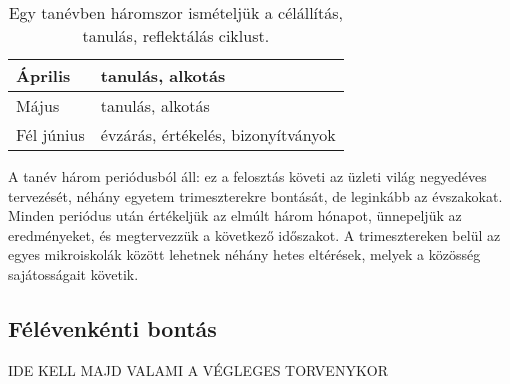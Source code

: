 \begin{table}
\begin{tabular}{ l|l }
    Április          &
    tanulás, alkotás
    \\ \hline

    Május            &
    tanulás, alkotás
    \\ \hline

    Fél június       &
    évzárás, értékelés, bizonyítványok
  \end{tabular}
  \caption{Egy tanévben háromszor ismételjük a célállítás, tanulás,
    reflektálás ciklust.}
  \label{tbl:tanevritmus}
\end{table}

A tanév három periódusból áll: ez a felosztás követi az üzleti világ negyedéves
tervezését, néhány egyetem trimeszterekre bontását, de leginkább az évszakokat.
Minden periódus után értékeljük az elmúlt három hónapot, ünnepeljük az
eredményeket, és megtervezzük a következő időszakot.  A trimesztereken belül az
egyes mikroiskolák között lehetnek néhány hetes eltérések, melyek a közösség
sajátosságait követik.

\subsection{Félévenkénti bontás}
IDE KELL MAJD VALAMI A VÉGLEGES TORVENYKOR
